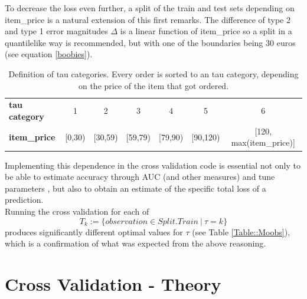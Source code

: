 \documentclass[a4paper,12pt]{article}
\begin{document}
To decrease the loss even further, a split of the train and test sets depending on item\_price is a natural extension of this first remarks.
The difference of type 2 and type 1 error magnitudes $\Delta$ is a linear function of item\_price so a split in a quantile\-like way is recommended, but with one of the boundaries being $30$ euros (see equation \ref{boobies}).
\begin{center}
\begin{table}[h]
\begin{tabular}{|l|| c | c | c | c | c | c |}
\hline
\textbf{tau category} & 1 & 2 & 3 & 4 & 5 & 6 \\
\textbf{item\_price}  & {[}0,30)   & {[}30,59)   & {[}59,79)  & {[}79,90)   & {[}90,120)    & {[}120, max(item\_price){]} \\
\hline
\end{tabular}
 \caption{Definition of tau categories. Every order is sorted to an tau category, depending on the price of the item that got ordered.}
 \label{Table::Tau}
\end{table}
\end{center}
Implementing this dependence in the cross validation code is essential not only to be able to estimate accuracy through AUC (and other measures) and tune parameters , but also to obtain an estimate of the specific total loss of a prediction.\\
Running the cross validation for each of $$T_k:=\{observation \in Split.Train \ | \ \tau = k\}$$ produces significantly different optimal values for $\tau$ (see Table \ref{Table::Moobs}), which is a confirmation of what was expected from the above reasoning. 

\section{Cross Validation - Theory}
\end{document}
